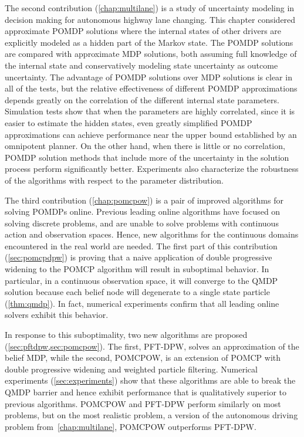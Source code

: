 The second contribution (\cref{chap:multilane}) is a study of uncertainty modeling in decision making for autonomous highway lane changing.
This chapter considered approximate POMDP solutions where the internal states of other drivers are explicitly modeled as a hidden part of the Markov state.
The POMDP solutions are compared with approximate MDP solutions, both assuming full knowledge of the internal state and conservatively modeling state uncertainty as outcome uncertainty.
The advantage of POMDP solutions over MDP solutions is clear in all of the tests, but the relative effectiveness of different POMDP approximations depends greatly on the correlation of the different internal state parameters.
Simulation tests show that when the parameters are highly correlated, since it is easier to estimate the hidden states, even greatly simplified POMDP approximations can achieve performance near the upper bound established by an omnipotent planner.
On the other hand, when there is little or no correlation, POMDP solution methods that include more of the uncertainty in the solution process perform significantly better.
Experiments also characterize the robustness of the algorithms with respect to the parameter distribution.

The third contribution (\cref{chap:pomcpow}) is a pair of improved algorithms for solving POMDPs online.
Previous leading online algorithms have focused on solving discrete problems, and are unable to solve problems with continuous action and observation spaces.
Hence, new algorithms for the continuous domains encountered in the real world are needed.
The first part of this contribution (\cref{sec:pomcpdpw}) is proving that a naive application of double progressive widening to the POMCP algorithm will result in suboptimal behavior.
In particular, in a continuous observation space, it will converge to the QMDP solution because each belief node will degenerate to a single state particle (\cref{thm:qmdp}).
In fact, numerical experiments confirm that all leading online solvers exhibit this behavior.

In response to this suboptimality, two new algorithms are proposed (\cref{sec:pftdpw,sec:pomcpow}).
The first, PFT-DPW, solves an approximation of the belief MDP, while the second, POMCPOW, is an extension of POMCP with double progressive widening and weighted particle filtering.
Numerical experiments (\cref{sec:experiments}) show that these algorithms are able to break the QMDP barrier and hence exhibit performance that is qualitatively superior to previous algorithms.
POMCPOW and PFT-DPW perform similarly on most problems, but on the most realistic problem, a version of the autonomous driving problem from~\cref{chap:multilane}, POMCPOW outperforms PFT-DPW.

